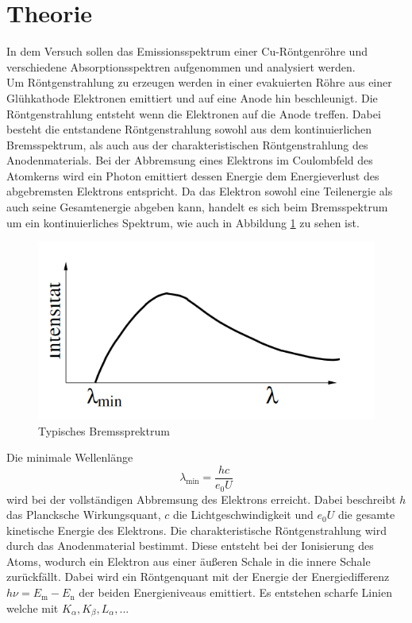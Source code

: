 \section{Theorie}
\label{sec:Theorie}
In dem Versuch sollen das Emissionsspektrum einer Cu-Röntgenröhre und verschiedene Absorptionsspektren aufgenommen und analysiert werden.
\\
Um Röntgenstrahlung zu erzeugen werden in einer evakuierten Röhre aus einer Glühkathode Elektronen emittiert und auf eine Anode hin beschleunigt. 
Die Röntgenstrahlung entsteht wenn die Elektronen auf die Anode treffen. Dabei besteht die entstandene Röntgenstrahlung sowohl aus dem kontinuierlichen
 Bremsspektrum, als auch aus der charakteristischen Röntgenstrahlung des Anodenmaterials. 
 Bei der Abbremsung eines Elektrons im Coulombfeld des Atomkerns wird ein Photon emittiert dessen Energie dem Energieverlust des abgebremsten Elektrons entspricht.
 Da das Elektron sowohl eine Teilenergie als auch seine Gesamtenergie abgeben kann, handelt es sich beim Bremsspektrum um ein kontinuierliches Spektrum, wie auch in Abbildung \ref{fig:Brems} zu sehen ist.
 \begin{figure}
    \centering
    \caption{Typisches Bremssprektrum \cite{V602}}
    \label{fig:Brems}
    \includegraphics[width = 0.6 \textwidth]{pics/Bremsspe.png}
\end{figure}
 Die minimale Wellenlänge 
 \begin{equation}
     \lambda_\text{min}=\frac{h c}{e_0 U}
     \label{eqn:lammin}
 \end{equation}
 wird bei der vollständigen Abbremsung des Elektrons erreicht.
 Dabei beschreibt $h$ das Plancksche Wirkungsquant, $c$ die Lichtgeschwindigkeit und $e_0 U$ die gesamte kinetische Energie des Elektrons.
 Die charakteristische Röntgenstrahlung wird durch das Anodenmaterial bestimmt. Diese entsteht bei der Ionisierung des Atoms, wodurch ein Elektron aus einer äußeren Schale in die innere Schale zurückfällt.
 Dabei wird ein Röntgenquant mit der Energie der Energiedifferenz $h \nu = E_\text{m}-E_\text{n}$ der beiden Energieniveaus emittiert. Es entstehen scharfe Linien welche mit $K_\alpha, K_\beta, L_\alpha, ...$ 
